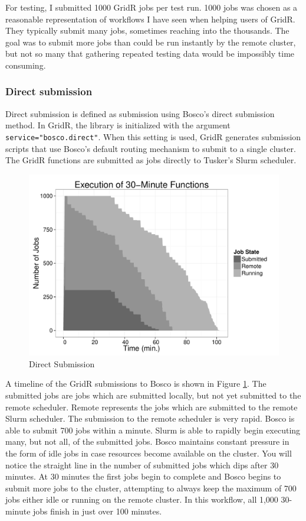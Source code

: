 For testing, I submitted 1000 GridR jobs per test run. 1000 jobs was chosen as a reasonable representation of workflows I have seen when helping users of GridR.  They typically submit many jobs, sometimes reaching into the thousands.  The goal was to submit more jobs than could be run instantly by the remote cluster, but not so many that gathering repeated testing data would be impossibly time consuming.

\subsubsection{Direct submission}
Direct submission is defined as submission using Bosco's direct submission method.  In GridR, the library is initialized with the argument \texttt{service="bosco.direct"}.  When this setting is used, GridR generates submission scripts that use Bosco's default routing mechanism to submit to a single cluster.  The GridR functions are submitted as jobs directly to Tusker's Slurm scheduler.

\begin{figure}[h!t]
\centering
\includegraphics[width=\textwidth]{BoscoRImages/30minplot-color.pdf}

\caption{Direct Submission}
\label{fig:directsubmit}
\end{figure}

A timeline of the GridR submissions to Bosco is shown in Figure \ref{fig:directsubmit}.  The submitted jobs are jobs which are submitted locally, but not yet submitted to the remote scheduler.  Remote represents the jobs which are submitted to the remote Slurm scheduler.  The submission to the remote scheduler is very rapid.  Bosco is able to submit 700 jobs within a minute.  Slurm is able to rapidly begin executing many, but not all, of the submitted jobs.  Bosco maintains constant pressure in the form of idle jobs in case resources become available on the cluster.  You will notice the straight line in the number of submitted jobs which dips after 30 minutes.  At 30 minutes the first jobs begin to complete and Bosco begins to submit more jobs to the cluster, attempting to always keep the maximum of 700 jobs either idle or running on the remote cluster.  In this workflow, all 1,000 30-minute jobs finish in just over 100 minutes.

